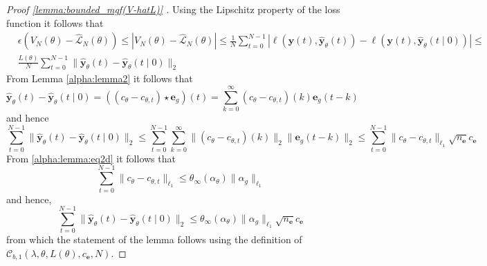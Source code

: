 \documentclass{article}
\def\rve{{\mathbf{e}}}
\def\rvy{{\mathbf{y}}}
\newcommand{\e}{\mathbf{e}}
\newcommand{\y}{\mathbf{y}}
\begin{document}
\begin{proof}[Proof \ref{lemma:bounded_mgf(V-hatL)} ]
        Using the Lipschitz property of the loss function it follows that 
    \begin{equation}
        \label{lemma:bounded_mgf(V-hatL):eq1}
       \begin{aligned}
        & \epsilon (V_N(\theta)-\hat{\mathcal{L}}_N(\theta)) \le 
      |V_N(\theta) - \hat{\mathcal{L}}_N(\theta)| \le 
    \frac{1}{N} \sum_{t=0}^{N-1}|\ell(\y(t),\hat{\rvy}_{\theta}(t)) 
    - \ell(\rvy(t),\hat{\rvy}_{\theta}(t \mid 0))|
  \le \\
  & %
    \frac{L(\theta)}{N} \sum_{t=0}^{N-1} \|\hat{\rvy}_{\theta}(t)-\hat{\rvy}_{\theta}(t \mid 0)\|_2
       \end{aligned}
    \end{equation}
    From Lemma \ref{alpha:lemma2} it follows that 
    \[ 
       \hat{\rvy}_{\theta}(t)-\hat{\rvy}_{\theta}(t \mid 0) = 
       ((c_{\theta}-c_{\theta,t})\star\e_g)(t)
       =\sum_{k=0}^{\infty} 
       (c_{\theta}-c_{\theta,t})(k)\e_g(t-k)
    \]
    and hence 
    \[ 
       \sum_{t=0}^{N-1}\|\hat{\rvy}_{\theta}(t)-\hat{\rvy}_{\theta}(t \mid 0)\|_2 \le \sum_{t=0}^{N-1} \sum_{k=0}^{\infty} \|(c_{\theta}-c_{\theta,t})(k)\|_{2} \|\e_g(t-k)\|_2 \le 
       \sum_{t=0}^{N-1} \|c_{\theta}-c_{\theta,t}\|_{\ell_1} \sqrt{n_\rve} c_\rve
    \]
    From \eqref{alpha:lemma:eq2d} it follows that 
    \[
       \sum_{t=0}^{N-1} \|c_{\theta}-c_{\theta,t}\|_{\ell_1} \le \theta_{\infty}(\alpha_{\theta}) \|\alpha_g\|_{\ell_1}
    \]
    and hence, 
    \[
   \sum_{t=0}^{N-1} \|\hat{\rvy}_{\theta}(t)-\hat{\rvy}_{\theta}(t \mid 0)\|_2 \le \theta_{\infty}(\alpha_{\theta}) \|\alpha_g\|_{\ell_1}\sqrt{n_\rve} c_\rve
    \]
    from which the statement of the lemma follows using the definition of $\mathcal{C}_{b,1}(\lambda,\theta,L(\theta),c_\rve,N)$.

\end{proof}
\end{document}
